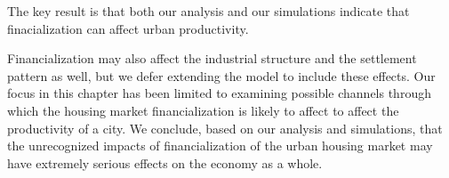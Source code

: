 The key result is that both our analysis and our simulations indicate that finacialization   can affect urban productivity. 

Financialization may also affect the industrial structure and the settlement pattern as well, but we defer extending the model to include these effects. Our focus in this chapter has been limited to examining possible channels through which the housing market financialization is likely to affect to affect the productivity of a city. We conclude, based on our analysis and simulations,  that the unrecognized impacts of financialization of the urban housing market may have extremely serious effects on the economy as a whole.








